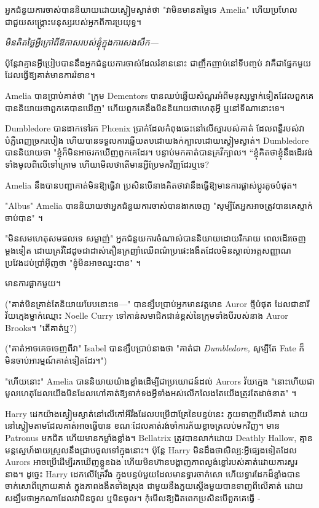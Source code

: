 {{{អ្នកជំនួយការចាស់បាននិយាយដោយស្ងៀមស្ងាត់ថា "វាមិនមានតម្លៃទេ Amelia" ហើយប្រហែលជាជួយសង្គ្រោះមនុស្សរបស់អ្នកពីការប្រយុទ្ធ។

\emph{មិនគិតថ្លៃអ្វីក្រៅពីឱកាសរបស់ខ្ញុំក្នុងការសងសឹក—}

ប៉ុន្តែវាគ្មានអ្វីប្រៀបបាននឹងអ្នកជំនួយការចាស់ដែលរំខាននោះ ជាញឹកញាប់នៅទីបញ្ចប់ វាគឺជាផ្នែកមួយដែលធ្វើឱ្យគាត់មានការរំខាន។

Amelia បានប្រាប់គាត់ថា "ក្រុម Dementors បានឈប់ឆ្លើយសំណួរអំពីមនុស្សម្នាក់ទៀតដែលពួកគេបាននិយាយថាពួកគេបានឃើញ" ហើយពួកគេនឹងមិននិយាយថាហេតុអ្វី ឬនៅទីណានោះទេ។

Dumbledore បានងាកទៅរក Phœnix ប្រាក់ដែលកំពុងឆេះនៅលើស្មារបស់គាត់ ដែលពន្លឺរបស់វាបំភ្លឺពេញច្រករបៀង ហើយបានទទួលការឆ្លើយតបដោយងក់ក្បាលដោយស្ងៀមស្ងាត់។ Dumbledore បាននិយាយថា "ខ្ញុំក៏មិនអាចរកឃើញពួកគេដែរ។ បន្ទាប់មកគាត់បានគ្រវីក្បាល។ “ខ្ញុំ​គិត​ថា​ខ្ញុំ​នឹង​ដើរ​វង់​ទាំង​មូល​ពី​លើ​ទៅ​ក្រោម ហើយ​មើល​ថា​តើ​មាន​អ្វី​ប្រែ​មក​វិញ​ដែរ​ឬ​ទេ?

Amelia នឹង​បាន​បញ្ជា​គាត់​មិន​ឱ្យ​ធ្វើ​វា ប្រសិនបើ​នាង​គិត​ថា​វា​នឹង​ធ្វើ​ឱ្យ​មាន​ការ​ផ្លាស់​ប្តូ​រ​តូច​បំផុត​។

"Albus" Amelia បាននិយាយថាអ្នកជំនួយការចាស់បានងាកចេញ "សូម្បីតែអ្នកអាចត្រូវបានគេស្ទាក់ចាប់បាន" ។

"មិនសមហេតុសមផលទេ សម្លាញ់" អ្នកជំនួយការចំណាស់បាននិយាយដោយរីករាយ ពេលដើរចេញម្តងទៀត ដោយគ្រវីដៃដូចជាដាស់តឿនក្រញាំឈើពណ៌ប្រផេះងងឹតដែលមិនស្គាល់អត្តសញ្ញាណប្រវែងដប់ប្រាំអ៊ីញថា "ខ្ញុំមិនអាចឈ្នះបាន" ។

មានការផ្អាកមួយ។

("គាត់​មិន​គ្រាន់​តែ​និយាយ​បែប​នោះ​ទេ—" បាន​ខ្សឹប​ប្រាប់​អ្នក​មាន​វត្តមាន Auror ថ្មី​បំផុត ដែល​ជា​នារី​វ័យ​ក្មេង​ម្នាក់​ឈ្មោះ Noelle Curry ទៅ​កាន់​សមាជិក​ជាន់​ខ្ពស់​នៃ​ក្រុម​ទាំង​បី​របស់​នាង Auror Brooks។ "តើ​គាត់​ឬ?)

("គាត់​អាច​គេច​ចេញ​ពី​វា" Isabel បាន​ខ្សឹប​ប្រាប់​នាង​ថា "គាត់​ជា \emph{Dumbledore,} សូម្បី​តែ Fate ក៏​មិន​ចាប់​អារម្មណ៍​គាត់​ទៀត​ដែរ។")

"ហើយនោះ" Amelia បាននិយាយយ៉ាងខ្លាំងដើម្បីជាប្រយោជន៍ដល់ Aurors វ័យក្មេង "នោះហើយជាមូលហេតុដែលយើងមិនដែលហៅគាត់ឱ្យទាក់ទងអ្វីទាំងអស់លើកលែងតែយើងត្រូវតែដាច់ខាត" ។

\later

Harry ដេក​យ៉ាង​ស្ងៀមស្ងាត់​នៅលើ​កៅអី​រឹង​ដែល​បម្រើ​ជា​គ្រែ​នៃ​បន្ទប់​នេះ ភួយ​ទាញ​ពីលើ​គាត់ ដោយ​នៅ​ស្ងៀម​តាម​ដែល​គាត់​អាចធ្វើ​បាន ខណៈ​ដែល​គាត់​រង់ចាំ​ការភ័យខ្លាច​ត្រលប់​មកវិញ។ មាន Patronus មកជិត ហើយមានកម្លាំងខ្លាំង។ Bellatrix ត្រូវបានលាក់ដោយ Deathly Hallow, គ្មានមន្តស្នេហ៍ងាយស្រួលនឹងជ្រាបចូលទៅក្នុងនោះ។ ប៉ុន្តែ Harry មិនដឹងថាសិល្បៈអ្វីផ្សេងទៀតដែល Aurors អាចប្រើដើម្បីរកឃើញខ្លួនឯង ហើយមិនហ៊ានបង្ហាញភាពល្ងង់ខ្លៅរបស់គាត់ដោយការសួរនាង។ ដូច្នេះ Harry ដេកលើគ្រែរឹង ក្នុងបន្ទប់មួយដែលមានទ្វារចាក់សោ ហើយទ្វារដែកដ៏ខ្លាំងបានចាក់សោពីក្រោយគាត់ ក្នុងភាពងងឹតទាំងស្រុង ជាមួយនឹងភួយស្តើងមួយបានទាញពីលើគាត់ ដោយសង្ឃឹមថាអ្នកណាដែលវាមិនចូល ឬមិនចូល។ កុំមើលឱ្យជិតពេកប្រសិនបើពួកគេធ្វើ -

}}}
